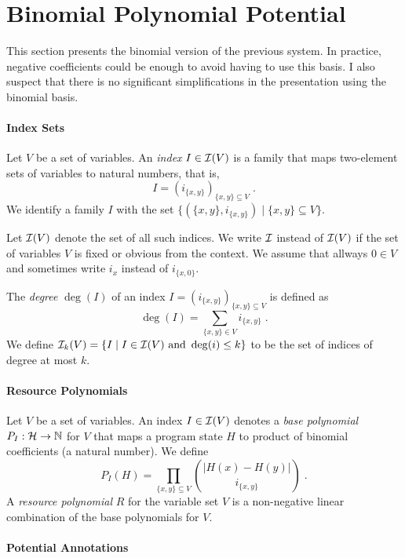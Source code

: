 \documentclass[nocopyrightspace,preprint]{sigplanconf-pldi15}
\begin{document}
\clearpage
\section{Binomial Polynomial Potential}

This section presents the binomial version of the previous system.
In practice, negative coefficients could be enough to avoid having to use
this basis.  I also suspect that there is no significant simplifications
in the presentation using the binomial basis.

\paragraph{Index Sets}

Let $V$ be a set of variables.  An \emph{index} $I \in \mathcal{I}(V)$ is a
family that maps two-element sets of variables to natural numbers,
that is,
$$
I = (i_{\{x,y\}})_{\{x,y\} \subseteq V} \; .
$$
%
We identify a family $I$ with the set $\{ (\{x,y\},i_{\{x,y\}})
\mid \{x,y\} \subseteq V\}$.

Let $\mathcal{I}(V)$ denote the set of all such indices.  We write $\mathcal{I}$
instead of $\mathcal{I}(V)$ if the set of variables $V$ is fixed or obvious
from the context.
%
We assume that allways $0 \in V$ and sometimes write $i_x$ instead of $i_{\{x,0\}}$.

The \emph{degree} $\deg(I)$ of an index $I = (i_{\{x,y\}})_{\{x,y\}
  \subseteq V}$ is defined as
$$
\deg(I) = \sum_{\{x,y\} \in V} i_{\{x,y\}} \;.
$$
We define $\mathcal{I}_k(V) = \{ I \mid I \in \mathcal{I}(V) \text{ and } \deg(i) \leq k
\}$ to be the set of indices of degree at most $k$.

\paragraph{Resource Polynomials}

Let $V$ be a set of variables.  An index $I \in \mathcal{I}(V)$ denotes a
\emph{base polynomial} $P_I : \mathcal{H} \to \mathbb{N}$ for $V$ that maps a
program state $H$ to product of binomial coefficients (a natural
number).  We define
$$
P_I(H) = \prod_{{\{x,y\}} \subseteq V} \binom {|H(x){-}H(y)|} {i_{\{x,y\}}} \; .
$$
%
A \emph{resource polynomial} $R$ for the variable set $V$ is a
non-negative linear combination of the base polynomials for $V$.

\paragraph{Potential Annotations}
\end{document}
